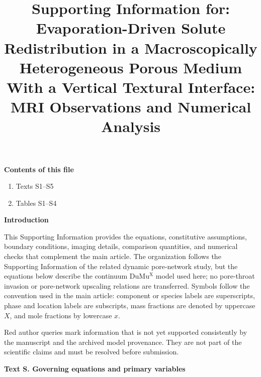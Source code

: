 \documentclass[draft,wrr]{agutexSI2019}
\newcounter{sitext}
\renewcommand{\thesitext}{S\arabic{sitext}}
\newcommand{\sitext}[1]{%
  \refstepcounter{sitext}%
  \par\medskip\noindent\textbf{Text \thesitext. #1}\par\medskip}
\begin{document}
\title{Supporting Information for: Evaporation-Driven Solute Redistribution
in a Macroscopically Heterogeneous Porous Medium With a Vertical Textural
Interface: MRI Observations and Numerical Analysis}

\makeatletter
\def\@oddfoot{}
\def\@evenfoot{}
\makeatother



\begin{article}
\footskip=12pt

\noindent\textbf{Contents of this file}
\begin{enumerate}
\item Texts S1--S5
\item Tables S1--S4
\end{enumerate}

\noindent\textbf{Introduction}

This Supporting Information provides the equations, constitutive assumptions,
boundary conditions, imaging details, comparison quantities, and numerical
checks that complement the main article. The organization follows the
Supporting Information of the related dynamic pore-network study, but the
equations below describe the continuum DuMu$^{\mathrm{X}}$ model used here; no
pore-throat invasion or pore-network upscaling relations are transferred.
Symbols follow the convention used in the main article: component or species
labels are superscripts, phase and location labels are subscripts, mass
fractions are denoted by uppercase $X$, and mole fractions by lowercase $x$.

Red author queries mark information that is not yet supported consistently by
the manuscript and the archived model provenance. They are not part of the
scientific claims and must be resolved before submission.

\sitext{Governing equations and primary variables}\label{app:governing}


\end{article}
\end{document}

